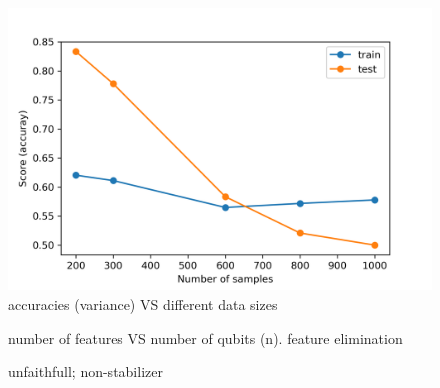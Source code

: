 \documentclass[
aps,
pra,
floatfix,
]{revtex4-2}
\theoremstyle{plain}
\theoremstyle{definition}
\begin{document}
\begin{figure}[!ht]
	\centering
	\includegraphics[width=.4\linewidth]{./Code/two_qubit_scores.png}
	\caption{accuracies (variance) VS different data sizes}
\end{figure}
\begin{figure}[!ht]
	\centering
	\caption{number of features VS number of qubits (n). feature elimination}
\end{figure}

\begin{figure}[!ht]
	\centering
	\caption{unfaithfull; non-stabilizer}
\end{figure}
\end{document}
